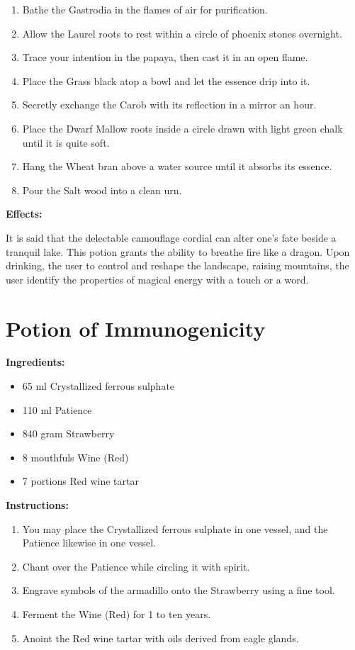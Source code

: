 \documentclass{article}
\begin{document}
\begin{enumerate}
  \item Bathe the Gastrodia in the flames of air for purification.
  \item Allow the Laurel roots to rest within a circle of phoenix stones overnight.
  \item Trace your intention in the papaya, then cast it in an open flame.
  \item Place the Grass black atop a bowl and let the essence drip into it.
  \item Secretly exchange the Carob with its reflection in a mirror an hour.
  \item Place the Dwarf Mallow roots inside a circle drawn with light green chalk until it is quite soft.
  \item Hang the Wheat bran above a water source until it absorbs its essence.
  \item Pour the Salt wood into a clean urn.
\end{enumerate}

\textbf{Effects:}

It is said that the delectable camouflage cordial can alter one's fate beside a tranquil lake. This potion grants the ability to breathe fire like a dragon. Upon drinking, the user to control and reshape the landscape, raising mountains, the user identify the properties of magical energy with a touch or a word.

\newpage
\section*{Potion of Immunogenicity}

\textbf{Ingredients:}

\begin{itemize}
  \item 65 ml Crystallized ferrous sulphate
  \item 110 ml Patience
  \item 840 gram Strawberry
  \item 8 mouthfuls Wine (Red)
  \item 7 portions Red wine tartar
\end{itemize}

\textbf{Instructions:}

\begin{enumerate}
  \item You may place the Crystallized ferrous sulphate in one vessel, and the Patience likewise in one vessel.
  \item Chant over the Patience while circling it with spirit.
  \item Engrave symbols of the armadillo onto the Strawberry using a fine tool.
  \item Ferment the Wine (Red) for 1 to ten years.
  \item Anoint the Red wine tartar with oils derived from eagle glands.
\end{enumerate}
\end{document}
